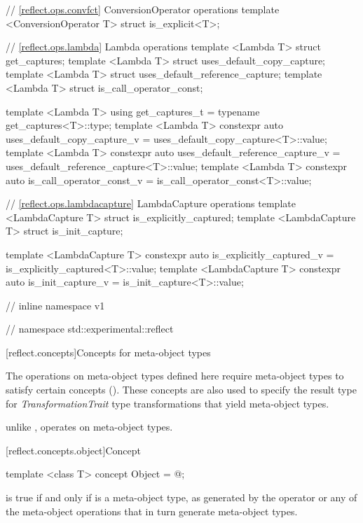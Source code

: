 \begin{std.txt}
\begin{codeblock}
{{// \ref{reflect.ops.convfct} ConversionOperator operations
template <ConversionOperator T> struct is_explicit<T>;

// \ref{reflect.ops.lambda} Lambda operations
template <Lambda T> struct get_captures;
template <Lambda T> struct uses_default_copy_capture;
template <Lambda T> struct uses_default_reference_capture;
template <Lambda T> struct is_call_operator_const;

template <Lambda T>
  using get_captures_t = typename get_captures<T>::type;
template <Lambda T>
  constexpr auto uses_default_copy_capture_v = uses_default_copy_capture<T>::value;
template <Lambda T>
  constexpr auto uses_default_reference_capture_v = uses_default_reference_capture<T>::value;
template <Lambda T>
  constexpr auto is_call_operator_const_v = is_call_operator_const<T>::value;

// \ref{reflect.ops.lambdacapture} LambdaCapture operations
template <LambdaCapture T> struct is_explicitly_captured;
template <LambdaCapture T> struct is_init_capture;

template <LambdaCapture T>
  constexpr auto is_explicitly_captured_v = is_explicitly_captured<T>::value;
template <LambdaCapture T>
  constexpr auto is_init_capture_v = is_init_capture<T>::value;

} // inline namespace v1
} // namespace std::experimental::reflect
\end{codeblock}
\end{std.txt}

[reflect.concepts]{Concepts for meta-object types}

\begin{std.txt}\color{addclr}
\pnum
The operations on meta-object types defined here require meta-object types to
satisfy certain concepts (). These concepts are also used to
specify the result type for \emph{TransformationTrait} type transformations that
yield meta-object types.
\begin{note} unlike ,  operates on meta-object types.\end{note}

\end{std.txt}

[reflect.concepts.object]{Concept }

\begin{std.txt}\color{addclr}

\begin{itemdecl}
template <class T> concept Object = @\seebelow@;
\end{itemdecl}

\begin{itemdescr}
\pnum
{} is true if and only if  is a meta-object type, as generated by the  operator or any of the meta-object operations that in turn generate meta-object types.

\end{itemdescr}
\end{std.txt}

